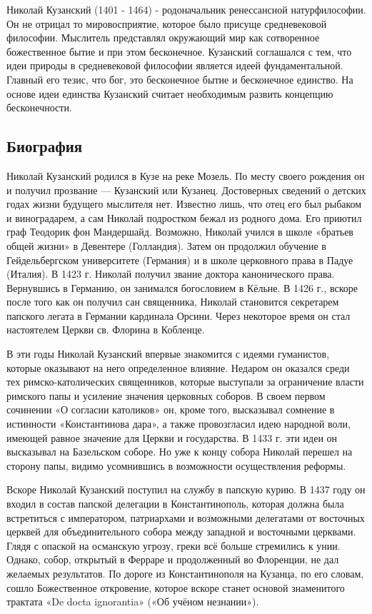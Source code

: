 \documentclass[
]{article}
\begin{document}
Николай Кузанский (1401 - 1464) - родоначальник ренессансной
натурфилософии. Он не отрицал то мировосприятие, которое было присуще
средневековой философии. Мыслитель представлял окружающий мир как
сотворенное божественное бытие и при этом бесконечное. Кузанский
соглашался с тем, что идеи природы в средневековой философии является
идеей фундаментальной. Главный его тезис, что бог, это бесконечное бытие
и бесконечное единство. На основе идеи единства Кузанский считает
необходимым развить концепцию бесконечности.

\hypertarget{ux431ux438ux43eux433ux440ux430ux444ux438ux44f}{%
\subsection{Биография}\label{ux431ux438ux43eux433ux440ux430ux444ux438ux44f}}

Николай Кузанский родился в Кузе на реке Мозель. По месту своего
рождения он и получил прозвание --- Кузанский или Кузанец. Достоверных
сведений о детских годах жизни будущего мыслителя нет. Известно лишь,
что отец его был рыбаком и виноградарем, а сам Николай подростком бежал
из родного дома. Его приютил граф Теодорик фон Мандершайд. Возможно,
Николай учился в школе «братьев общей жизни» в Девентере (Голландия).
Затем он продолжил обучение в Гейдельбергском университете (Германия) и
в школе церковного права в Падуе (Италия). В 1423 г. Николай получил
звание доктора канонического права. Вернувшись в Германию, он занимался
богословием в Кёльне. В 1426 г., вскоре после того как он получил сан
священника, Николай становится секретарем папского легата в Германии
кардинала Орсини. Через некоторое время он стал настоятелем Церкви св.
Флорина в Кобленце.

В эти годы Николай Кузанский впервые знакомится с идеями гуманистов,
которые оказывают на него определенное влияние. Недаром он оказался
среди тех римско-католических священников, которые выступали за
ограничение власти римского папы и усиление значения церковных соборов.
В своем первом сочинении «О согласии католиков» он, кроме того,
высказывал сомнение в истинности «Константинова дара», а также
провозгласил идею народной воли, имеющей равное значение для Церкви и
государства. В 1433 г. эти идеи он высказывал на Базельском соборе. Но
уже к концу собора Николай перешел на сторону папы, видимо усомнившись в
возможности осуществления реформы.

Вскоре Николай Кузанский поступил на службу в папскую курию. В 1437 году
он входил в состав папской делегации в Константинополь, которая должна
была встретиться с императором, патриархами и возможными делегатами от
восточных церквей для объединительного собора между западной и
восточными церквами. Глядя с опаской на османскую угрозу, греки всё
больше стремились к унии. Однако, собор, открытый в Ферраре и
продолженный во Флоренции, не дал желаемых результатов. По дороге из
Константинополя на Кузанца, по его словам, сошло Божественное
откровение, которое вскоре станет основой знаменитого трактата «De docta
ignorantia» («Об учёном незнании»).
\end{document}
